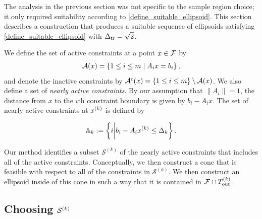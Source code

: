 \documentclass{article}
\begin{document}
\label{the_safe_ellipsoid}

The analysis in the previous section was not specific to the sample region choice; it only required suitability according to \cref{define_suitable_ellipsoid}.
This section describes a construction that produces a suitable sequence of ellipsoids satisfying \cref{define_suitable_ellipsoid} with $\Delta_{\textrm{tr}}=\sqrt{2}$.

We define the set of active constraints at a point $x \in {\mathcal F}$ by
\begin{align}
{\mathcal A}(x) = \left\{1 \le i \le m \; | \; {{A}}_ix = {{b}}_i \right\},\label{define_activei}
\end{align}
and denote the inactive constraints by ${\mathcal A}^c(x) = \left\{1 \le i \le m\right\} \setminus {\mathcal A}(x)$.   We also define a set of {\em nearly active constraints}.   By our assumption that $\|A_i\|=1$, the distance from $x$ to the $i$th constraint boundary is given by $b_i-A_i x$.  The set of nearly active constraints at $x^{(k)}$ is defined by

%
%
\begin{align}
{\mathbb A_{k}} := \left\{i \bigg| b_i-A_i x^{(k)} \le \Delta_k \right\}.
\label{define_activeconstraints}
\end{align}

Our method identifies a subset $\mathcal{S}^{(k)}$ of the nearly active constraints that includes all of the active constraints.   Conceptually,  we then construct a cone that is feasible with respect to all of the constraints in $\mathcal{S}^{(k)}$.   We then
construct an ellipsoid inside of this cone in such a way that it is contained in ${\mathcal F} \cap {T_{\text{out}}^{(k)}}$.  

\subsection{Choosing $\mathcal{S}^{(k)}$}
\label{Choosing_activeconstraints}
\end{document}
